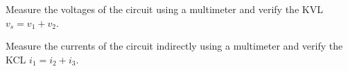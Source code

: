 \documentclass[11pt]{article}
\begin{document}
\begin{question}
\begin{subquestion}{Measure the voltages of the circuit using a multimeter and verify the KVL $v_s=v_1+v_2$.}
{        }
    \end{subquestion}

    \begin{subquestion}{Measure the currents of the circuit indirectly using a multimeter and verify the KCL $i_1=i_2+i_3$.}
\end{subquestion}
\end{question}
\end{document}
